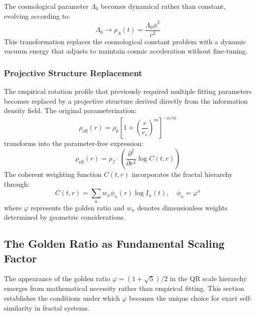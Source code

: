 The cosmological parameter $\Lambda_0$ becomes dynamical rather than constant, evolving according to:
\begin{equation}
\Lambda_0 \rightarrow \rho_\Lambda(t) = \frac{\Lambda_0 \phi^2}{c^2}
\label{eq:lambda-evolution}
\end{equation}
This transformation replaces the cosmological constant problem with a dynamic vacuum energy that adjusts to maintain cosmic acceleration without fine-tuning.

\subsubsection{Projective Structure Replacement}
\label{subsubsec:projective-replacement}

The empirical rotation profile that previously required multiple fitting parameters becomes replaced by a projective structure derived directly from the information density field. The original parameterization:
\begin{equation}
\rho_{\text{eff}}(r) = \rho_0 \left[1 + \left(\frac{r}{r_s}\right)^m \right]^{-n/m}
\label{eq:empirical-profile}
\end{equation}
transforms into the parameter-free expression:
\begin{equation}
\rho_{\text{eff}}(r) = \rho_{\mathcal{I}} \cdot \left(\frac{\partial^2}{\partial r^2} \log C(t,r)\right)
\label{eq:projective-profile}
\end{equation}
The coherent weighting function $C(t,r)$ incorporates the fractal hierarchy through:
\begin{equation}
C(t,r) = \sum_n w_n \phi_n(r) \log I_n(t), \quad \phi_n = \varphi^n
\label{eq:coherent-weighting}
\end{equation}
where $\varphi$ represents the golden ratio and $w_n$ denotes dimensionless weights determined by geometric considerations.

\subsection{The Golden Ratio as Fundamental Scaling Factor}
\label{subsec:golden-ratio-fundamental}

The appearance of the golden ratio $\varphi = (1+\sqrt{5})/2$ in the QR scale hierarchy emerges from mathematical necessity rather than empirical fitting. This section establishes the conditions under which $\varphi$ becomes the unique choice for exact self-similarity in fractal systems.

